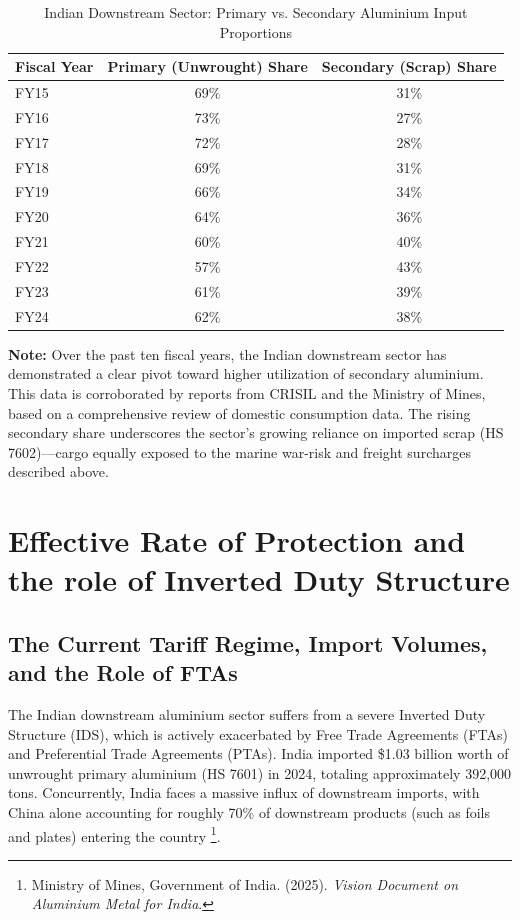 \documentclass[11pt, a4paper]{article}
\numberwithin{figure}{section}
\numberwithin{table}{section}
\begin{document}
\begin{table}[H]
    \centering
    \caption{Indian Downstream Sector: Primary vs. Secondary Aluminium Input Proportions}
    \label{tab:aluminium_shares}
    \begin{tabular}{lcc}
        \toprule
        \textbf{Fiscal Year} & \textbf{Primary (Unwrought) Share} & \textbf{Secondary (Scrap) Share} \\
        \midrule
        FY15 & 69\% & 31\% \\
        FY16 & 73\% & 27\% \\
        FY17 & 72\% & 28\% \\
        FY18 & 69\% & 31\% \\
        FY19 & 66\% & 34\% \\
        FY20 & 64\% & 36\% \\
        FY21 & 60\% & 40\% \\
        FY22 & 57\% & 43\% \\
        FY23 & 61\% & 39\% \\
        FY24 & 62\% & 38\% \\
        \bottomrule
    \end{tabular}
    \vspace{0.5cm}

    \raggedright
    \small \textbf{Note:} Over the past ten fiscal years, the Indian downstream sector has demonstrated a clear pivot toward higher utilization of secondary aluminium. This data is corroborated by reports from CRISIL and the Ministry of Mines, based on a comprehensive review of domestic consumption data. The rising secondary share underscores the sector's growing reliance on imported scrap (HS 7602)—cargo equally exposed to the marine war-risk and freight surcharges described above.
\end{table}

\section{Effective Rate of Protection and the role of Inverted Duty Structure}

\subsection{The Current Tariff Regime, Import Volumes, and the Role of FTAs}
The Indian downstream aluminium sector suffers from a severe Inverted Duty Structure (IDS), which is actively exacerbated by Free Trade Agreements (FTAs) and Preferential Trade Agreements (PTAs). India imported \$1.03 billion worth of unwrought primary aluminium (HS 7601) in 2024, totaling approximately 392,000 tons. Concurrently, India faces a massive influx of downstream imports, with China alone accounting for roughly 70\% of downstream products (such as foils and plates) entering the country \cite{mom_vision2025}\footnote{Ministry of Mines, Government of India. (2025). \textit{Vision Document on Aluminium Metal for India}.}.
\end{document}
